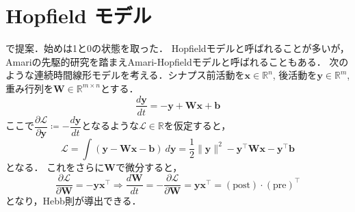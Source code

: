 \section{Hopfield モデル}
\citep{Hopfield1982-vu}で提案．始めは1と0の状態を取った．
Hopfieldモデルと呼ばれることが多いが，Amariの先駆的研究\citep{Amari1972-fq}を踏まえAmari-Hopfieldモデルと呼ばれることもある．
次のような連続時間線形モデルを考える．シナプス前活動を$\mathbf{x}\in \mathbb{R}^n$, 後活動を$\mathbf{y}\in \mathbb{R}^m$, 重み行列を$\mathbf{W}\in \mathbb{R}^{m\times n}$とする．
\begin{equation}
\frac{d\mathbf{y}}{dt}=-\mathbf{y}+\mathbf{W}\mathbf{x}+\mathbf{b}
\end{equation}
ここで$\dfrac{\partial\mathcal{L}}{\partial\mathbf{y}}\coloneqq -\dfrac{d\mathbf{y}}{dt}$となるような$\mathcal{L}\in \mathbb{R}$を仮定すると，
\begin{equation}
\mathcal{L}=\int \left(\mathbf{y}-\mathbf{W}\mathbf{x}-\mathbf{b}\right)\ d\mathbf{y}=\frac{1}{2}\|\mathbf{y}\|^2-\mathbf{y}^\top \mathbf{W}\mathbf{x}-\mathbf{y}^\top \mathbf{b}
\end{equation}
となる． これをさらに$\mathbf{W}$で微分すると，
\begin{equation}
\dfrac{\partial\mathcal{L}}{\partial\mathbf{W}}=-\mathbf{y}\mathbf{x}^\top\Rightarrow
\frac{d\mathbf{W}}{dt}=-\dfrac{\partial\mathcal{L}}{\partial\mathbf{W}}=\mathbf{y}\mathbf{x}^\top=(\text{post})\cdot (\text{pre})^\top
\end{equation}
となり，Hebb則が導出できる．
